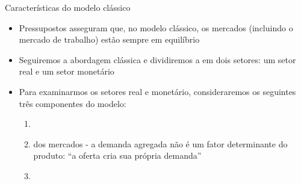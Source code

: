 \documentclass[10pt]{beamer}
\begin{document}
\begin{frame}{Características do modelo clássico}
    \begin{itemize}
        \item Pressupostos asseguram que, no modelo clássico, os mercados (incluindo o mercado de trabalho) estão sempre em equilíbrio\bigskip

        \item Seguiremos a abordagem clássica e dividiremos a  em dois setores: um setor real e um setor monetário\bigskip

        \item Para examinarmos os setores real e monetário, consideraremos os seguintes três componentes do modelo:\bigskip

              \begin{enumerate}
                  \item {}\medskip

                  \item {} dos mercados - a demanda agregada não é um fator determinante do produto: ``a oferta cria sua própria demanda''\medskip

                  \item {}
              \end{enumerate}
    \end{itemize}
\end{frame}
\end{document}
